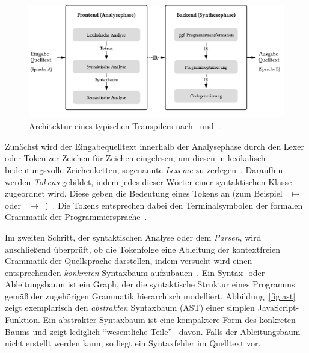 \bigbreak
\begin{figure}[htb]
  \includegraphics[width=\textwidth]{src/2_Grundlagen/fig/transpiler-architecture.pdf}
  \caption{Architektur eines typischen Transpilers nach~\autocite{EVGENIY:2016} und~\autocite[8]{TORCZON:2007}.}
	\label{fig:transpiler-architecture}
\end{figure}

Zunächst wird der Eingabequelltext innerhalb der Analysephase durch den Lexer oder Tokenizer Zeichen für Zeichen eingelesen, um diesen in lexikalisch bedeutungsvolle Zeichenketten, sogenannte \emph{Lexeme} zu zerlegen~\autocite[43]{AHO:COMPILERS}. Daraufhin werden \emph{Tokens} gebildet, indem jedes dieser Wörter einer syntaktischen Klasse zugeordnet wird. Diese geben die Bedeutung eines Tokens an (zum Beispiel ~$\mapsto$~ oder \code{!=}~$\mapsto$~)~\autocite[26]{TORCZON:2007}. Die Tokens entsprechen dabei den Terminalsymbolen der formalen Grammatik der Programmiersprache~\autocite[43]{AHO:COMPILERS}.

Im zweiten Schritt, der syntaktischen Analyse oder dem \emph{Parsen}, wird anschließend überprüft, ob die Tokenfolge eine Ableitung der kontextfreien Grammatik der Quellsprache darstellen, indem versucht wird einen entsprechenden \emph{konkreten} Syntaxbaum aufzubauen~\autocite{SCHOEPP:COMPILER}. Ein Syntax- oder Ableitungsbaum ist ein Graph, der die syntaktische Struktur eines Programms gemäß der zugehörigen Grammatik hierarchisch modelliert. Abbildung~\ref{fig:ast} zeigt exemplarisch den \emph{abstrakten} Syntaxbaum (AST) einer simplen JavaScript-Funktion. Ein abstrakter Syntaxbaum ist eine kompaktere Form des konkreten Baums und zeigt lediglich \enquote{wesentliche Teile}~\autocite[21]{WALDMANN:PPS} davon. Falls der Ableitungsbaum nicht erstellt werden kann, so liegt ein Syntaxfehler im Quelltext vor.

